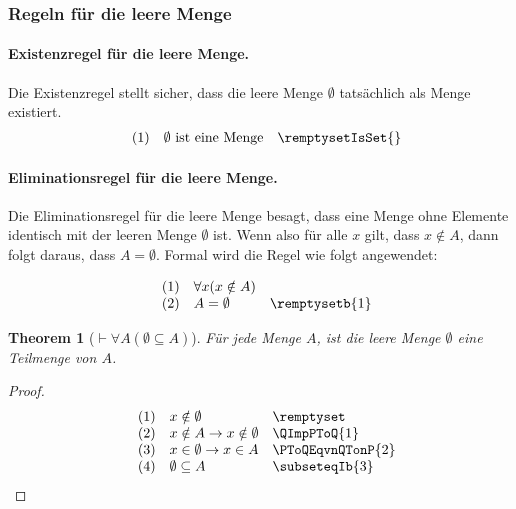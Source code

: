 \documentclass{book}
\theoremstyle{plain}
\newtheorem{theorem}{Theorem}
\theoremstyle{remark}
\theoremstyle{definition}
\begin{document}
\subsubsection{Regeln für die leere Menge}


\paragraph{Existenzregel für die leere Menge.}
\label{rule:remptysetIsSet}
Die Existenzregel stellt sicher, dass die leere Menge \(\emptyset\) tatsächlich als Menge existiert.
\[
\begin{array}{llll}
	& (1) & \emptyset\text{ ist eine Menge} & \remptysetIsSet{} \\
\end{array}
\]


\paragraph{Eliminationsregel für die leere Menge.}
\label{rule:remptysetb}
Die Eliminationsregel für die leere Menge besagt, dass eine Menge ohne Elemente identisch mit der leeren Menge \(\emptyset\) ist. Wenn also für alle \(x\) gilt, dass \(x \notin A\), dann folgt daraus, dass \(A = \emptyset\). Formal wird die Regel wie folgt angewendet:

\[
\begin{array}{llll}
	& (1) & \forall x(x\notin A) & \\
	& (2) & A = \emptyset & \remptysetb{1} \\
\end{array}
\]

\label{ImpFaALpEmptysetSubseteqARp}
\begin{theorem}[\(\vdash\forall A (\emptyset\subseteq A)\)]
	Für jede Menge \( A \), ist die leere Menge \( \emptyset \) eine Teilmenge von \( A \).
\end{theorem}
\begin{proof}
	\[
	\begin{array}{llll}
		& (1) & x\notin\emptyset & \remptyset \\
		& (2) & x\notin A\rightarrow x\notin\emptyset & \QImpPToQ{1}\\  
		& (3) & x\in \emptyset\rightarrow x\in A & \PToQEqvnQTonP{2}\\ 
		& (4) & \emptyset\subseteq A & \subseteqIb{3}\\ 			
	\end{array}
	\]
\end{proof}
\end{document}
